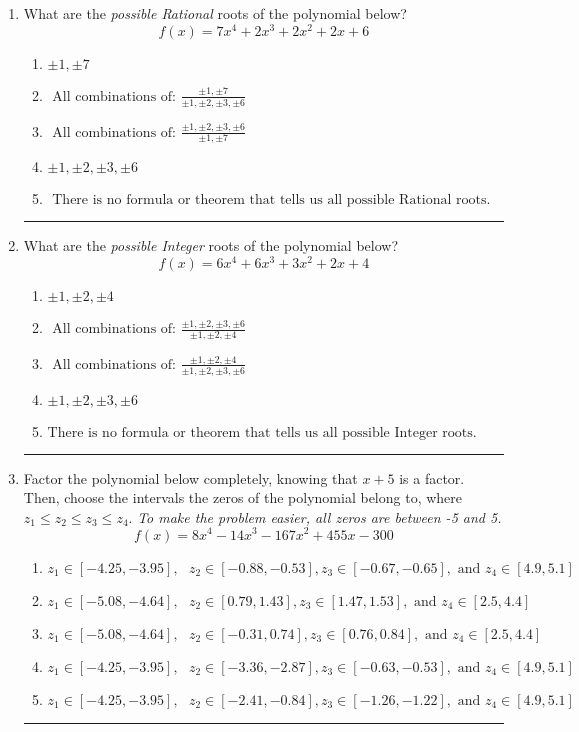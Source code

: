 \documentclass[14pt]{extbook}
\newcommand{\litem}[1]{\item#1\hspace*{-1cm}\rule{\textwidth}{0.4pt}}
\begin{document}
\begin{enumerate}
\litem{
What are the \textit{possible Rational} roots of the polynomial below?\[ f(x) = 7x^{4} +2 x^{3} +2 x^{2} +2 x + 6 \]\begin{enumerate}[label=\Alph*.]
\item \( \pm 1,\pm 7 \)
\item \( \text{ All combinations of: }\frac{\pm 1,\pm 7}{\pm 1,\pm 2,\pm 3,\pm 6} \)
\item \( \text{ All combinations of: }\frac{\pm 1,\pm 2,\pm 3,\pm 6}{\pm 1,\pm 7} \)
\item \( \pm 1,\pm 2,\pm 3,\pm 6 \)
\item \( \text{ There is no formula or theorem that tells us all possible Rational roots.} \)

\end{enumerate} }
\litem{
What are the \textit{possible Integer} roots of the polynomial below?\[ f(x) = 6x^{4} +6 x^{3} +3 x^{2} +2 x + 4 \]\begin{enumerate}[label=\Alph*.]
\item \( \pm 1,\pm 2,\pm 4 \)
\item \( \text{ All combinations of: }\frac{\pm 1,\pm 2,\pm 3,\pm 6}{\pm 1,\pm 2,\pm 4} \)
\item \( \text{ All combinations of: }\frac{\pm 1,\pm 2,\pm 4}{\pm 1,\pm 2,\pm 3,\pm 6} \)
\item \( \pm 1,\pm 2,\pm 3,\pm 6 \)
\item \( \text{There is no formula or theorem that tells us all possible Integer roots.} \)

\end{enumerate} }
\litem{
Factor the polynomial below completely, knowing that $x + 5$ is a factor. Then, choose the intervals the zeros of the polynomial belong to, where $z_1 \leq z_2 \leq z_3 \leq z_4$. \textit{To make the problem easier, all zeros are between -5 and 5.}\[ f(x) = 8x^{4} -14 x^{3} -167 x^{2} +455 x -300 \]\begin{enumerate}[label=\Alph*.]
\item \( z_1 \in [-4.25, -3.95], \text{   }  z_2 \in [-0.88, -0.53], z_3 \in [-0.67, -0.65], \text{   and   } z_4 \in [4.9, 5.1] \)
\item \( z_1 \in [-5.08, -4.64], \text{   }  z_2 \in [0.79, 1.43], z_3 \in [1.47, 1.53], \text{   and   } z_4 \in [2.5, 4.4] \)
\item \( z_1 \in [-5.08, -4.64], \text{   }  z_2 \in [-0.31, 0.74], z_3 \in [0.76, 0.84], \text{   and   } z_4 \in [2.5, 4.4] \)
\item \( z_1 \in [-4.25, -3.95], \text{   }  z_2 \in [-3.36, -2.87], z_3 \in [-0.63, -0.53], \text{   and   } z_4 \in [4.9, 5.1] \)
\item \( z_1 \in [-4.25, -3.95], \text{   }  z_2 \in [-2.41, -0.84], z_3 \in [-1.26, -1.22], \text{   and   } z_4 \in [4.9, 5.1] \)


\end{enumerate}}
\end{enumerate}
\end{document}
